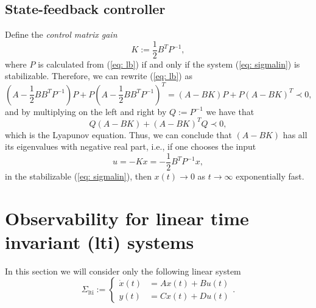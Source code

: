 \subsection{State-feedback controller}
Define the \emph{control matrix gain}
\begin{equation}
	K:=\frac{1}{2}B^TP^{-1}, \label{eq: K}
\end{equation}
where $P$ is calculated from (\ref{eq: lb}) if and only if the system (\ref{eq: sigmalin}) is stabilizable. Therefore, we can rewrite (\ref{eq: lb}) as
\begin{equation}
	(A - \frac{1}{2}BB^TP^{-1})P + P(A - \frac{1}{2}BB^TP^{-1})^T = (A-BK)P+P(A-BK)^T \prec 0,
\end{equation}
and by multiplying on the left and right by $Q:=P^{-1}$ we have that
\begin{equation}
	Q(A-BK)+(A-BK)^TQ \prec 0,
\end{equation}
which is the Lyapunov equation. Thus, we can conclude that $(A-BK)$ has all its eigenvalues with negative real part, i.e., if one chooses the input 
\begin{equation}
	u = -Kx = -\frac{1}{2}B^TP^{-1}x, \label{eq: conK}
\end{equation}
in the stabilizable (\ref{eq: sigmalin}), then $x(t) \to 0$ as $t\to\infty$ exponentially fast.

\section{Observability for linear time invariant (lti) systems}
In this section we will consider only the following linear system
\begin{equation}
	\Sigma_{\text{lti}} := \begin{cases}
	\dot x(t) &= Ax(t) + Bu(t) \\
		y(t) &= Cx(t) + Du(t)
	\end{cases}.
\label{eq: sigmalinc}
\end{equation}
